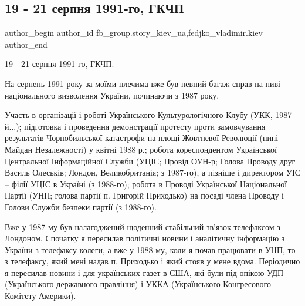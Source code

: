  
 
 
 
 
 
\subsection{19 - 21 серпня 1991-го, ГКЧП}
\label{sec:25_11_2021.fb.fb_group.story_kiev_ua.1.1991_gkchp}
 
\ifcmt
 author_begin
   author_id fb_group.story_kiev_ua,fedjko_vladimir.kiev
 author_end
\fi

19 - 21 серпня 1991-го, ГКЧП. 

\begin{multicols}{2} %
\setlength{\parindent}{0pt}

На серпень 1991 року за моїми плечима вже був певний багаж справ на ниві
національного визволення України, починаючи з 1987 року. 

Участь в організації і роботі Українського Культурологічного Клубу (УКК,
1987-й...); підготовка і проведення демонстрації протесту проти замовчування
результатів Чорнобильської катастрофи на площі Жовтневої Революції (нині Майдан
Незалежності) у квітні 1988 р.; робота кореспондентом Української Центральної
Інформаційної Служби (УЦІС; Провід ОУН-р; Голова Проводу друг Василь Олеськів;
Лондон, Великобританія; з 1987-го), а пізніше і директором УІС – філії УЦІС в
Україні (з 1988-го); робота в Проводі Української Національної Партії (УНП;
голова партії п. Григорій Приходько) на посаді члена Проводу і Голови Служби
безпеки партії (з 1988-го). 


\end{multicols} %

Вже у 1987-му був налагоджений щоденний стабільний зв’язок телефаксом з
Лондоном. Спочатку я пересилав політичні новини і аналітичну інформацію з
України з телефаксу колеги, а вже у 1988-му, коли я почав працювати в УНП, то з
телефаксу, який мені надав п. Приходько і який стояв у мене вдома. Періодично я
пересилав новини і для українських газет в США, які були під опікою УДП
(Українського державного правління) і УККА (Українського Конгресового Комітету
Америки).

